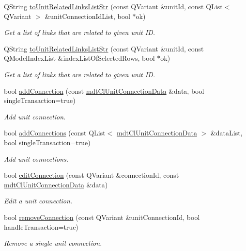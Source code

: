 \begin{DoxyCompactItemize}
Q\-String \hyperlink{classmdt_cl_unit_af87a65741ba7a6aa9f47a996005a9c3a}{to\-Unit\-Related\-Links\-List\-Str} (const Q\-Variant \&unit\-Id, const Q\-List$<$ Q\-Variant $>$ \&unit\-Connection\-Id\-List, bool $\ast$ok)
\begin{DoxyCompactList}\small\item\em Get a list of links that are related to given unit I\-D. \end{DoxyCompactList}\item 
Q\-String \hyperlink{classmdt_cl_unit_ab04f2394a504d8a5ecf26c3f986e6e13}{to\-Unit\-Related\-Links\-List\-Str} (const Q\-Variant \&unit\-Id, const Q\-Model\-Index\-List \&index\-List\-Of\-Selected\-Rows, bool $\ast$ok)
\begin{DoxyCompactList}\small\item\em Get a list of links that are related to given unit I\-D. \end{DoxyCompactList}\item 
bool \hyperlink{classmdt_cl_unit_a42b6918f809126d4ca1002c343f90316}{add\-Connection} (const \hyperlink{classmdt_cl_unit_connection_data}{mdt\-Cl\-Unit\-Connection\-Data} \&data, bool single\-Transaction=true)
\begin{DoxyCompactList}\small\item\em Add unit connection. \end{DoxyCompactList}\item 
bool \hyperlink{classmdt_cl_unit_a23c85173bd518a70e8fbae27f3e121ad}{add\-Connections} (const Q\-List$<$ \hyperlink{classmdt_cl_unit_connection_data}{mdt\-Cl\-Unit\-Connection\-Data} $>$ \&data\-List, bool single\-Transaction=true)
\begin{DoxyCompactList}\small\item\em Add unit connections. \end{DoxyCompactList}\item 
bool \hyperlink{classmdt_cl_unit_aac3afb2a4895a16f637b765b44cbca9e}{edit\-Connection} (const Q\-Variant \&connection\-Id, const \hyperlink{classmdt_cl_unit_connection_data}{mdt\-Cl\-Unit\-Connection\-Data} \&data)
\begin{DoxyCompactList}\small\item\em Edit a unit connection. \end{DoxyCompactList}\item 
bool \hyperlink{classmdt_cl_unit_aa4b4f148293abc335704515251ed4f5b}{remove\-Connection} (const Q\-Variant \&unit\-Connection\-Id, bool handle\-Transaction=true)
\begin{DoxyCompactList}\small\item\em Remove a single unit connection. \end{DoxyCompactList}\item 

\end{DoxyCompactItemize}
